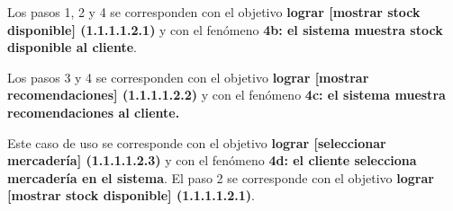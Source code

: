 Los pasos 1, 2 y 4 se corresponden con el objetivo \textbf{lograr [mostrar stock disponible] (1.1.1.1.2.1)} y con el fenómeno \textbf{4b: el sistema muestra stock disponible al cliente}.

Los pasos 3 y 4 se corresponden con el objetivo \textbf{lograr [mostrar recomendaciones] (1.1.1.1.2.2)} y con el fenómeno \textbf{4c: el sistema muestra recomendaciones al cliente.}

%
%
\begin{casodeuso}
\end{casodeuso}

Este caso de uso se corresponde con el objetivo \textbf{lograr [seleccionar mercadería] (1.1.1.1.2.3)} y con el fenómeno \textbf{4d: el cliente selecciona mercadería en el sistema}. El paso 2 se corresponde con el objetivo \textbf{lograr [mostrar stock disponible] (1.1.1.1.2.1)}.

